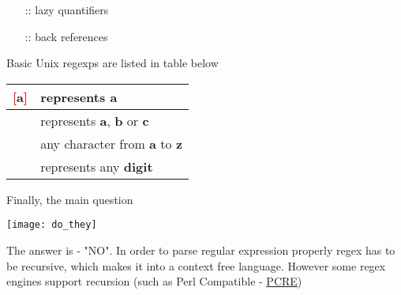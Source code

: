 \begin{multicols*}{2}
\begin{itemize}
    \item[::] lazy quantifiers
    \item[::] back references
\end{itemize}

Basic Unix regexps are listed in table below\vspace{.5em}

\begin{Table}

\begin{tabular}{K{.2\linewidth}|K{.75\linewidth}}
\hline
\textcolor{red}{[}a\textcolor{red}{]}  & represents \textbf{a}\\[.4em] \hline
[\textcolor{red}{abc}] & represents \textbf{a}, \textbf{b} or \textbf{c} \\[.4em]  & any character from \textbf{a} to \textbf{z} \\[.4em]  & represents any \textbf{digit} \\[.4em] \hline
\end{tabular}
\vspace{.5em}
\end{Table}\vspace{.5em}


Finally, the main question \vspace{.5em}

\begin{Figure}
 \centering
 \texttt{[image: do\_they]}
\end{Figure} \vspace{.5em}

The answer is - "NO". In order to parse regular expression properly regex has to be recursive, which makes it into a context free language. However some regex engines support recursion (such as Perl Compatible - \href{https://en.wikipedia.org/wiki/Perl_Compatible_Regular_Expressions}{PCRE})



\end{multicols*}
